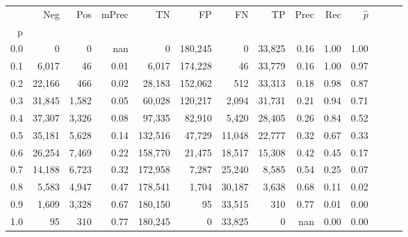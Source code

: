 \begin{tabular}{rrrrrrrrrrrrrr}
\toprule
{} &     Neg &    Pos & mPrec &       TN &       FP &      FN &      TP &  Prec &   Rec & $\hat{p}$ \\
p   &         &        &       &          &          &         &         &       &       &           \\
\midrule
0.0 &       0 &      0 &   nan &        0 &  180,245 &       0 &  33,825 &  0.16 &  1.00 &      1.00 \\
0.1 &   6,017 &     46 &  0.01 &    6,017 &  174,228 &      46 &  33,779 &  0.16 &  1.00 &      0.97 \\
0.2 &  22,166 &    466 &  0.02 &   28,183 &  152,062 &     512 &  33,313 &  0.18 &  0.98 &      0.87 \\
0.3 &  31,845 &  1,582 &  0.05 &   60,028 &  120,217 &   2,094 &  31,731 &  0.21 &  0.94 &      0.71 \\
0.4 &  37,307 &  3,326 &  0.08 &   97,335 &   82,910 &   5,420 &  28,405 &  0.26 &  0.84 &      0.52 \\
0.5 &  35,181 &  5,628 &  0.14 &  132,516 &   47,729 &  11,048 &  22,777 &  0.32 &  0.67 &      0.33 \\
0.6 &  26,254 &  7,469 &  0.22 &  158,770 &   21,475 &  18,517 &  15,308 &  0.42 &  0.45 &      0.17 \\
0.7 &  14,188 &  6,723 &  0.32 &  172,958 &    7,287 &  25,240 &   8,585 &  0.54 &  0.25 &      0.07 \\
0.8 &   5,583 &  4,947 &  0.47 &  178,541 &    1,704 &  30,187 &   3,638 &  0.68 &  0.11 &      0.02 \\
0.9 &   1,609 &  3,328 &  0.67 &  180,150 &       95 &  33,515 &     310 &  0.77 &  0.01 &      0.00 \\
1.0 &      95 &    310 &  0.77 &  180,245 &        0 &  33,825 &       0 &   nan &  0.00 &      0.00 \\
\bottomrule
\end{tabular}
